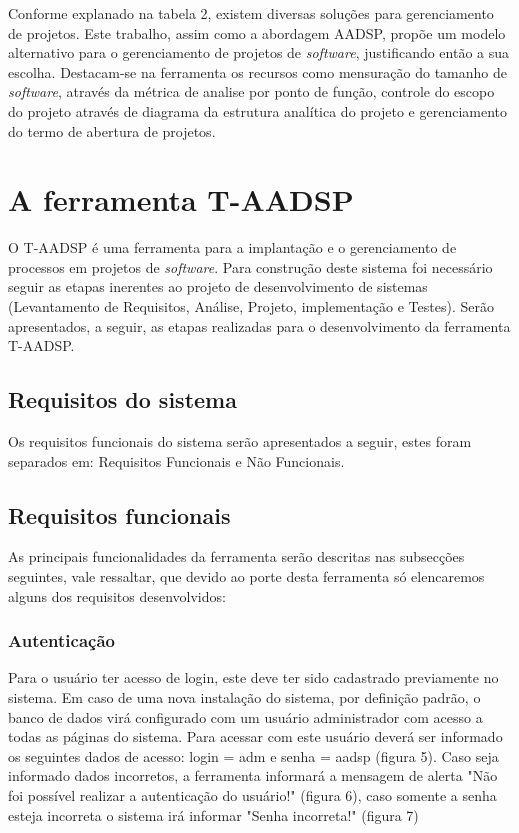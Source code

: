 \documentclass{acm_proc_article-sp}
\begin{document}
Conforme explanado na tabela 2, existem diversas soluções para gerenciamento de projetos. Este trabalho, assim como a abordagem AADSP, propõe um modelo alternativo para o gerenciamento de projetos de \textit{software}, justificando então a sua escolha. Destacam-se na ferramenta os recursos como mensuração do tamanho de \textit{software}, através da métrica de analise por ponto de função, controle do escopo do projeto através de diagrama da estrutura analítica do projeto e gerenciamento do termo de abertura de projetos. 

\section{A ferramenta T-AADSP}
O T-AADSP é uma ferramenta para a implantação e o gerenciamento de processos em projetos de \textit{software}. Para construção deste sistema foi necessário seguir as etapas inerentes ao projeto de desenvolvimento de sistemas (Levantamento de Requisitos, Análise, Projeto, implementação e Testes).
Serão apresentados, a seguir, as etapas realizadas para o desenvolvimento da ferramenta T-AADSP.

\subsection{Requisitos do sistema}
Os requisitos funcionais do sistema serão apresentados a seguir, estes foram separados em: Requisitos Funcionais e Não Funcionais.

\subsection{Requisitos funcionais}
As principais funcionalidades da ferramenta serão descritas
nas subsecções seguintes, vale ressaltar, que devido ao porte desta ferramenta só elencaremos alguns dos requisitos desenvolvidos:

\subsubsection{Autenticação}
Para o usuário ter acesso de login, este deve ter sido cadastrado previamente no sistema. Em caso de uma nova instalação do sistema, por definição padrão, o banco de dados virá configurado com um usuário administrador com acesso a todas as páginas do sistema. Para acessar com este usuário deverá ser informado os seguintes dados de acesso: login = adm e senha = aadsp (figura 5). Caso seja informado dados incorretos, a ferramenta informará a mensagem de alerta "Não foi possível realizar a autenticação do usuário!" (figura 6), caso somente a senha esteja incorreta o sistema irá informar "Senha incorreta!" (figura 7)
\end{document}
